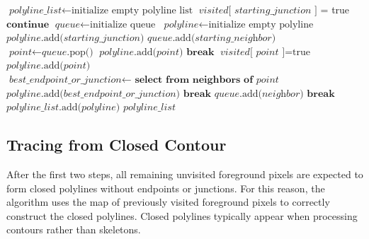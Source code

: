 {
	\begin{algorithmic}[1]
		\State $\textit{polyline\_list} \gets \text{initialize empty polyline list}$
		\State
		\State $\textit{visited}\text{[ }\textit{starting\_junction}\text{ ]}$ = true
		\State
		\State $\textbf{continue}$
		\EndIf
		\State
		\State $\textit{queue} \gets \text{initialize queue}$
		\State $\textit{polyline} \gets \text{initialize empty polyline}$
		\State $\textit{polyline}\text{.add(}\textit{starting\_junction}\text{)}$
		\State
		\State $\textit{queue}\text{.add(}\textit{starting\_neighbor}\text{)}$
		\State $\textit{point} \gets \textit{queue}\text{.pop()}$ 
		\State
		\State $\textit{polyline}\text{.add(}\textit{point}\text{)}$
		\State $\textbf{break}$
		\EndIf
		\State
		\State $\textit{visited}\text{[}\textit{ point }\text{]} = \text{true}$
		\State $\textit{polyline}\text{.add(}\textit{point}\text{)}$
		\State
		\State $\textit{best\_endpoint\_or\_junction}\gets\textbf{ select from neighbors of }\textit{point}$
		\State $\textit{polyline}\text{.add(}\textit{best\_endpoint\_or\_junction}\text{)}$
		\State $\textbf{break}$
		\EndIf
		\State
		\State $\textit{queue}\text{.add(}\textit{neighbor}\text{)}$
		\State $\textbf{break}$
		\EndIf
		\EndFor
		\EndWhile
		\State
		\State $\textit{polyline\_list}\text{.add(}\textit{polyline}\text{)}$
		\EndFor
		\State
		\State
		\Return $\textit{polyline\_list}$
		\EndProcedure
	\end{algorithmic}
}


\subsection{Tracing from Closed Contour}

After the first two steps, all remaining unvisited foreground pixels are expected to form closed polylines without endpoints or junctions. For this reason, the algorithm uses the map of previously visited foreground pixels to correctly construct the closed polylines. Closed polylines typically appear when processing contours rather than skeletons.

